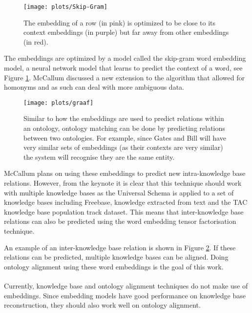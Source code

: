 \documentclass{article}
\begin{document}
 \begin{figure}[H]
 \centering
 \texttt{[image: plots/Skip-Gram]}
 \caption[Skip-Gram model]{The embedding of a row (in pink) is optimized to be close to its context embeddings (in purple) but far away from other embeddings (in red).}
 \label{Skip-Gram-img}
 \end{figure}
 
 The embeddings are optimized by a model called the skip-gram word embedding model\cite{w2v}, a neural network model that learns to predict the context of a word, see Figure \ref{Skip-Gram-img}. McCallum discussed a new extension to the algorithm that allowed for homonyms and as such can deal with more ambiguous data\cite{mccallumweblecture}.
  
 \begin{figure}[H]
 \centering
 \texttt{[image: plots/graaf]}
 \caption[Ontology matching graph example]{Similar to how the embeddings are used to predict relations within an ontology, ontology matching can be done by predicting relations between two ontologies. For example, since Gates and Bill will have very similar sets of embeddings (as their contexts are very similar) the system will recognise they are the same entity.}
 \label{merge_graph}
 \end{figure}

 
 McCallum plans on using these embeddings to predict new intra-knowledge base relations. However, from the keynote it is clear that this technique should work with multiple knowledge bases as the Universal Schema is applied to a set of knowledge bases including Freebase, knowledge extracted from text and the TAC knowledge base population track dataset. This means that inter-knowledge base relations can also be predicted using the word embedding tensor factorisation technique.
 
 An example of an inter-knowledge base relation is shown in Figure \ref{merge_graph}. If these relations can be predicted, multiple knowledge bases can be aligned. Doing ontology alignment using these word embeddings is the goal of this work.
 \paragraph{}
 Currently, knowledge base and ontology alignment techniques do not make use of embeddings. Since embedding models have good performance on knowledge base reconstruction\cite{universalschema}, they should also work well on ontology alignment.
 
\end{document}
